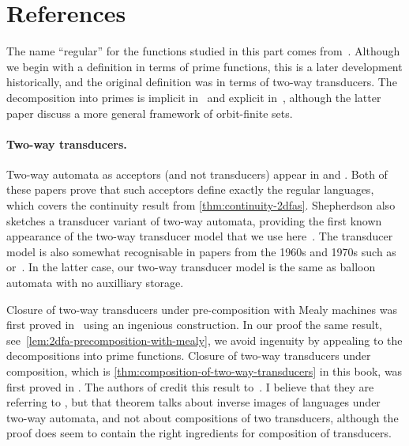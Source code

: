 \section{References}
\label{sec:regular-bib}

The name ``regular'' for the functions studied in this part comes from~\cite[p. 217]{engelfrietHoogeboom2001}. Although we begin with a definition in terms of prime functions, this is a later development historically, and the   original definition was in terms of two-way transducers.  The decomposition into primes is implicit in~\cite{bojanczykDaviaudKrishna2018} and explicit in~\cite[Theorem 18]{bojanczykStefanski2020}, although the latter paper discuss a more general framework of orbit-finite sets. 

\paragraph*{Two-way transducers.}
Two-way automata as acceptors (and not transducers) appear in \cite[Definition 2]{shepherdson1959reduction} and \cite[Definition 13]{RabinScott59}. Both of these papers prove that such acceptors define exactly the regular languages, which covers the continuity result from \cref{thm:continuity-2dfas}. Shepherdson also sketches a transducer variant of two-way automata, providing the first known appearance of the two-way transducer model that we use here~\cite[Note 4]{shepherdson1959reduction}. The transducer model is also somewhat recognisable in papers from the 1960s and 1970s such as~\cite{hopcroftUllman1967} or~\cite{AhoHopcroftUllman1969}. In the latter case, our two-way transducer model is the same as balloon automata with no auxilliary storage. 


Closure of two-way transducers under pre-composition with Mealy machines was first proved in~\cite[Theorem 5]{hopcroftUllman1967} using an ingenious construction. In our proof the same result, see~\cref{lem:2dfa-precomposition-with-mealy}, we avoid ingenuity by appealing to the decompositions into prime functions. 
Closure of two-way transducers under composition, which is \cref{thm:composition-of-two-way-transducers} in this book,  was first proved in \cite[Theorem 2]{ChytilJakl1977}. The authors of \cite{ChytilJakl1977} credit this result to~\cite{AhoUllman1970}. I believe that they are referring to \cite[Theorem 2]{AhoUllman1970}, but that theorem talks about inverse images of languages under two-way automata, and not about compositions of two transducers, although the proof does seem to contain the right ingredients for composition of transducers.


